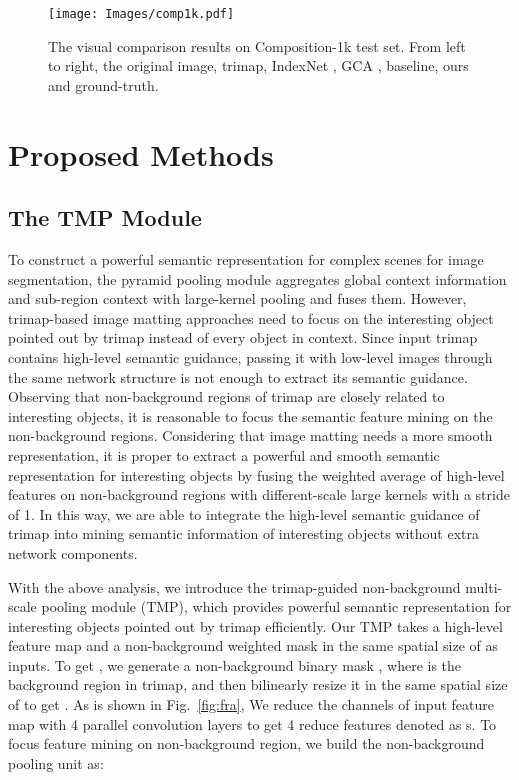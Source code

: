 \documentclass[10pt,twocolumn,letterpaper]{article}
\begin{document}
\begin{figure*}[t]
	\centering
	\texttt{[image: Images/comp1k.pdf]}
	\caption{The visual comparison results on Composition-1k \cite{deepmatting} test set. From left to right, the original image, trimap, IndexNet \cite{indexnet}, GCA \cite{gca}, baseline, ours and ground-truth. }
	\label{fig:comp1k}
\end{figure*}

\section{Proposed Methods}
\subsection{The TMP Module}
To construct a powerful semantic representation for complex scenes for image segmentation, the pyramid pooling module \cite{psp} aggregates global context information and sub-region context with large-kernel pooling and fuses them. However, trimap-based image matting approaches need to focus on the interesting object pointed out by trimap instead of every object in context.  Since input trimap contains high-level semantic guidance, passing it with low-level images through the same network structure is not enough to extract its  semantic guidance. Observing that non-background regions of trimap are closely related to interesting objects, it is reasonable to focus the semantic feature mining on the non-background regions. Considering that image matting needs a more smooth representation, it is proper to extract a powerful and smooth  semantic representation for interesting objects by fusing the weighted average of high-level features on non-background regions with different-scale large kernels with a stride of 1. In this way, we are able to integrate the high-level semantic guidance of trimap into mining semantic information of interesting objects without extra network components.


With the above analysis, we  introduce the trimap-guided non-background multi-scale pooling module (TMP), which provides powerful semantic representation for interesting objects pointed out by trimap efficiently. Our TMP takes a high-level feature map  and a non-background weighted mask  in the same spatial size of  as inputs. To get , we generate a non-background binary mask  , where  is the background region in trimap, and then bilinearly resize it  in  the same spatial size of  to get  . As is shown in Fig.~\ref{fig:fra}, We reduce the channels of input feature map  with 4 parallel  convolution layers to get 4 reduce features denoted as s. To focus feature mining on non-background region, we build the non-background pooling unit  as:
\end{document}
